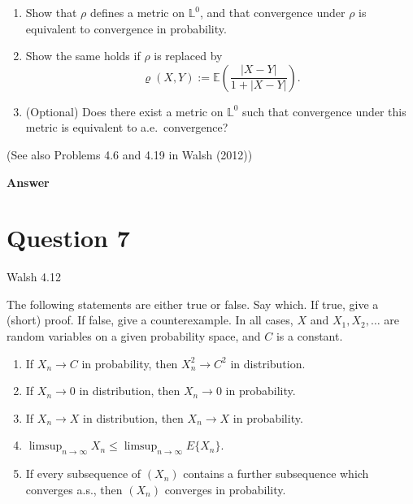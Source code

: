 \documentclass[letterpaper]{article}
\begin{document}
		\begin{enumerate}
			\item[(i)] Show that $\rho$ defines a metric on $\mathbb{L}^{0}$, and that convergence under $\rho$ is equivalent to convergence in probability.
			
			\item[(ii)] Show the same holds if $\rho$ is replaced by
			\[
			\varrho(X,Y):=\mathbb{E}\!\left(\frac{|X-Y|}{1+|X-Y|}\right).
			\]
			
			\item[(iii)] (Optional) Does there exist a metric on $\mathbb{L}^{0}$ such that convergence under this metric is equivalent to a.e.\ convergence?
		\end{enumerate}
		
		(See also Problems 4.6 and 4.19 in Walsh (2012))
		
		\textbf{Answer}
		
		\clearpage
		
		
		
		\section{Question 7}
		
		{\color{deepred} Walsh 4.12} 
		
		The following statements are either true or false. Say which. If true, give a (short) proof. If false, give a counterexample. In all cases, $X$ and $X_1, X_2, \ldots$ are random variables on a given probability space, and $C$ is a constant.
	
\begin{enumerate}
\item[(a)] If $X_n \to C$ in probability, then $X_n^2 \to C^2$ in distribution.

\item[(b)] If $X_n \to 0$ in distribution, then $X_n \to 0$ in probability.

\item[(c)] If $X_n \to X$ in distribution, then $X_n \to X$ in probability.

\item[(d)] $\displaystyle \limsup_{n\to\infty} X_n \le \limsup_{n\to\infty} E\{X_n\}.$

\item[(e)] If every subsequence of $(X_n)$ contains a further subsequence which converges a.s., then $(X_n)$ converges in probability.
\end{enumerate}
		
\end{document}
